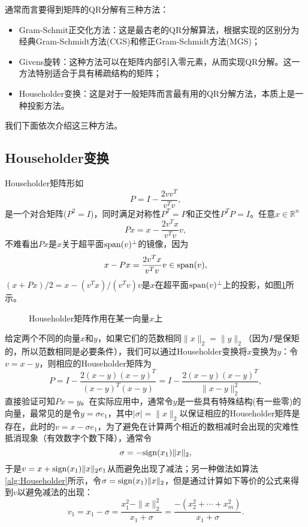 \documentclass[a4paper,10pt]{ctexart}
\begin{document}
通常而言要得到矩阵的QR分解有三种方法：
\begin{itemize}
    \item Gram-Schmit正交化方法：这是最古老的QR分解算法，根据实现的区别分为经典Gram-Schmidt方法(CGS)和修正Gram-Schmidt方法(MGS)；
    \item Givens旋转：这种方法可以在矩阵内部引入零元素，从而实现QR分解。这一方法特别适合于具有稀疏结构的矩阵；
    \item Householder变换：这是对于一般矩阵而言最有用的QR分解方法，本质上是一种投影方法。
\end{itemize}
我们下面依次介绍这三种方法。
\subsection{Householder变换}
Householder矩阵形如
\begin{equation}
    P = I - \frac{2vv^T}{v^T v},
\end{equation}
是一个对合矩阵($ P^2 = I $)，同时满足对称性$ P^T = P $和正交性$ P^T P = I $。任意$ x\in \mathbb{R}^n $
\[
    Px = x - \frac{2v^T x}{v^T v}v,
\]
不难看出$ Px $是$ x $关于超平面$ {\rm span}(v)^\perp $的镜像，因为
\[
    x - Px = \frac{2v^T x}{v^T v}v \in {\rm span}(v),
\]
$ (x + Px) / 2 = x - (v^T x)/(v^Tv)v $是$ x $在超平面$ {\rm span}(v)^\perp $上的投影，如图\ref{fig:Householder}所示。
\begin{figure}[htpb]
    \centering
    \caption{Householder矩阵作用在某一向量$ x $上}
    \label{fig:Householder}
\end{figure}

给定两个不同的向量$ x $和$ y $，如果它们的范数相同$ \| x \|_2 = \| y \|_2 $（因为$ P $是保矩的，所以范数相同是必要条件），我们可以通过Householder变换将$ x $变换为$ y $：令$ v = x - y $，则相应的Householder矩阵为
\[
    P = I - \frac{2(x - y)(x - y)^T}{(x - y)^T(x - y)} = I - \frac{2(x - y)(x - y)^T}{\| x - y \|_2^2},
\]
直接验证可知$ Px = y $。在实际应用中，通常令$ y $是一些具有特殊结构(有一些零)的向量，最常见的是令$ y = \sigma e_1 $，其中$ |\sigma| = \| x \|_2 $以保证相应的Householder矩阵是存在，此时的$ v = x - \sigma e_1 $，为了避免在计算两个相近的数相减时会出现的灾难性抵消现象（有效数字个数下降），通常令
\[
    \sigma = - {\rm sign}(x_1) \| x \|_2,
\]
于是$ v = x + {\rm sign}(x_1) \| x \|_2 e_1 $从而避免出现了减法；另一种做法如算法\ref{alg:Householder}所示，令$ \sigma = {\rm sign}(x_1) \| x \|_2 $，但是通过计算如下等价的公式来得到$ v $以避免减法的出现：
\begin{equation}\label{eq:Householder}
    v_1 = x_1 - \sigma = \frac{x_1^2 - \| x \|_2^2}{x_1+\sigma} = \frac{-(x_2^2 + \cdots + x_m^2)}{x_1+\sigma}.
\end{equation}
\end{document}
